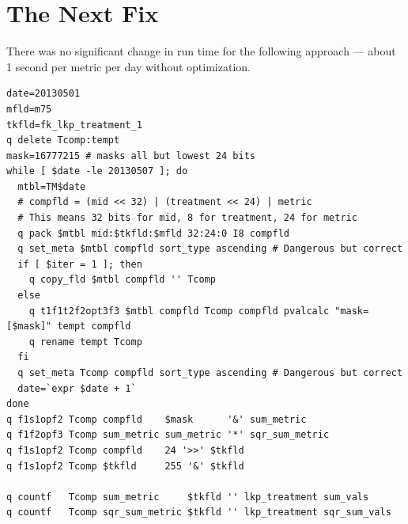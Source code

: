\section{The Next Fix}
\label{The_Next_Fix}

There was no significant change in run time for the following approach
--- about 1 second per metric per day without optimization.

\begin{verbatim}
date=20130501
mfld=m75
tkfld=fk_lkp_treatment_1
q delete Tcomp:tempt
mask=16777215 # masks all but lowest 24 bits
while [ $date -le 20130507 ]; do
  mtbl=TM$date
  # compfld = (mid << 32) | (treatment << 24) | metric
  # This means 32 bits for mid, 8 for treatment, 24 for metric
  q pack $mtbl mid:$tkfld:$mfld 32:24:0 I8 compfld
  q set_meta $mtbl compfld sort_type ascending # Dangerous but correct
  if [ $iter = 1 ]; then
    q copy_fld $mtbl compfld '' Tcomp
  else
    q t1f1t2f2opt3f3 $mtbl compfld Tcomp compfld pvalcalc "mask=[$mask]" tempt compfld
    q rename tempt Tcomp 
  fi
  q set_meta Tcomp compfld sort_type ascending # Dangerous but correct
  date=`expr $date + 1`
done
q f1s1opf2 Tcomp compfld    $mask      '&' sum_metric
q f1f2opf3 Tcomp sum_metric sum_metric '*' sqr_sum_metric
q f1s1opf2 Tcomp compfld    24 '>>' $tkfld
q f1s1opf2 Tcomp $tkfld     255 '&' $tkfld

q countf   Tcomp sum_metric     $tkfld '' lkp_treatment sum_vals
q countf   Tcomp sqr_sum_metric $tkfld '' lkp_treatment sqr_sum_vals
\end{verbatim}
